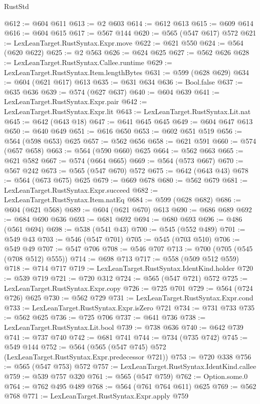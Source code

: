 \begin{lexlean}{RustStd}
\begin{coremodule}
@612 := @604 @611
@613 := @2 @603
@614 := @612 @613
@615 := @609 @614
@616 := @604 @615
@617 := @567 @144
@620 := @565 (@547 @617) @572
@621 := LexLeanTarget.RustSyntax.Expr.move
@622 := @621 @550
@624 := @564 (@620 @622)
@625 := @2 @563
@626 := @624 @625
@627 := @562 @626
@628 := LexLeanTarget.RustSyntax.Callee.runtime
@629 := LexLeanTarget.RustSyntax.Item.lengthBytes
@631 := @599 (@628 @629)
@634 := @604 (@621 @617) @613
@635 := @631 @634
@636 := Bool.false
@637 := @635 @636
@639 := @574 (@627 @637)
@640 := @604 @639
@641 := LexLeanTarget.RustSyntax.Expr.pair
@642 := LexLeanTarget.RustSyntax.Expr.lit
@643 := LexLeanTarget.RustSyntax.Lit.nat
@645 := @642 (@643 @18)
@647 := @641 @645 @645
@649 := @604 @647 @613
@650 := @640 @649
@651 := @616 @650
@653 := @602 @651 @519
@656 := @564 (@598 @653) @625
@657 := @562 @656
@658 := @621 @591
@660 := @574 (@657 @658)
@663 := @564 (@590 @660) @625
@664 := @562 @663
@665 := @621 @582
@667 := @574 (@664 @665)
@669 := @564 (@573 @667)
@670 := @567 @242
@673 := @565 (@547 @670) @572
@675 := @642 (@643 @43)
@678 := @564 (@673 @675) @625
@679 := @669 @678
@680 := @562 @679
@681 := LexLeanTarget.RustSyntax.Expr.succeed
@682 := LexLeanTarget.RustSyntax.Item.natEq
@684 := @599 (@628 @682)
@686 := @604 (@621 @568)
@689 := @604 (@621 @670) @613
@690 := @686 @689
@692 := @684 @690 @636
@693 := @681 @692
@694 := @680 @693
@696 := @486 (@561 @694)
@698 := @538 (@541 @43)
@700 := @545 (@552 @489)
@701 := @549 @43
@703 := @546 (@547 @701)
@705 := @545 (@703 @510)
@706 := @549 @49
@707 := @547 @706
@708 := @546 @707
@713 := @700 (@705 (@545 (@708 @512) @555))
@714 := @698 @713
@717 := @558 (@509 @512 @559)
@718 := @714 @717
@719 := LexLeanTarget.RustSyntax.IdentKind.holder
@720 := @539 @719
@721 := @720 @312
@724 := @565 (@547 @721) @572
@725 := LexLeanTarget.RustSyntax.Expr.copy
@726 := @725 @701
@729 := @564 (@724 @726) @625
@730 := @562 @729
@731 := LexLeanTarget.RustSyntax.Expr.cond
@733 := LexLeanTarget.RustSyntax.Expr.isZero @721
@734 := @731 @733
@735 := @562 @625
@736 := @725 @706
@737 := @641 @736
@738 := LexLeanTarget.RustSyntax.Lit.bool
@739 := @738 @636
@740 := @642 @739
@741 := @737 @740
@742 := @681 @741
@744 := @734 (@735 @742)
@745 := @549 @144
@752 := @564 (@565 (@547 @745) @572 (LexLeanTarget.RustSyntax.Expr.predecessor @721))
@753 := @720 @338
@756 := @565 (@547 @753) @572
@757 := LexLeanTarget.RustSyntax.IdentKind.callee
@759 := @539 @757 @320
@761 := @565 (@547 @759)
@762 := Option.some.{0}
@764 := @762 @495 @489
@768 := @564 (@761 @764 @611) @625
@769 := @562 @768
@771 := LexLeanTarget.RustSyntax.Expr.apply @759

\end{coremodule}
\end{lexlean}
